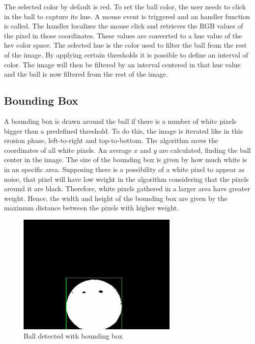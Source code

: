 The selected color by default is red. To set the ball color, the user needs to click in the ball to capture its hue. A mouse event is triggered and an handler function is called. The handler localizes the mouse click and retrieves the RGB values of the pixel in those coordinates. These values are converted to a hue value of the \gls{hsv} color space. The selected hue is the color used to filter the ball from the rest of the image. By applying certain thresholds it is possible to define an interval of color. The image will then be filtered by an interval centered in that hue value and the ball is now filtered from the rest of the image. 


\subsection{Bounding Box}

A bounding box is drawn around the ball if there is a number of white pixels bigger than a predefined threshold. To do this, the image is iterated like in this erosion phase, left-to-right and top-to-bottom. The algorithm saves the coordinates of all white pixels. An average $x$ and $y$ are calculated, finding the ball center in the image. The size of the bounding box is given by how much white is in an specific area. Supposing there is a possibility of a white pixel to appear as noise, that pixel will have low weight in the algorithm considering that the pixels around it are black. Therefore, white pixels gathered in a larger area have greater weight. Hence, the width and height of the bounding box are given by the maximum distance between the pixels with higher weight.


\begin{figure}[htp]
	
	\centering
	\includegraphics[width=0.7\textwidth]{capcalib/imgs/ball_detect.png}
	
	\caption{Ball detected with bounding box}
	\label{fig:balldetect}
	
\end{figure}

